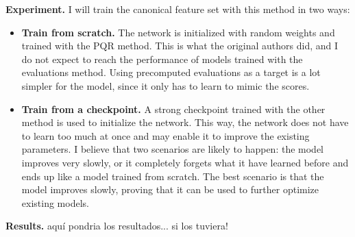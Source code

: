 \textbf{Experiment.} I will train the canonical  feature set with this method in two ways:

\begin{itemize}
\item \textbf{Train from scratch.} The network is initialized with random weights and trained with the PQR method. This is what the original authors did, and I do not expect to reach the performance of models trained with the evaluations method. Using precomputed evaluations as a target is a lot simpler for the model, since it only has to learn to mimic the scores.

\item \textbf{Train from a checkpoint.} A strong checkpoint trained with the other method is used to initialize the network. This way, the network does not have to learn too much at once and may enable it to improve the existing parameters. I believe that two scenarios are likely to happen: the model improves very slowly, or it completely forgets what it have learned before and ends up like a model trained from scratch. The best scenario is that the model improves slowly, proving that it can be used to further optimize existing models.
\end{itemize}

\textbf{Results.} aquí pondria los resultados... si los tuviera!
